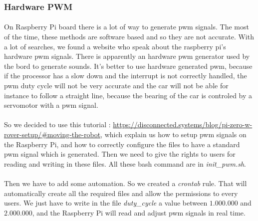 \subsubsection{Hardware PWM}
\paragraph{}
On Raspberry Pi board there is a lot of way to generate pwm signals.
The most of the time, these methods are software based and so they are not
accurate. With a lot of searches, we found a website who speak about the
raspberry pi's hardware pwm signals. There is apparently an hardware pwm
generator used by the bord to generate sounds. It's better to use hardware 
generated pwm, because if the processor has a slow down and the interrupt
is not correctly handled, the pwm duty cycle will not be very accurate and
the car will not be able for instance to follow a straight line, because the
bearing of the car is controled by a servomotor with a pwm signal.

\paragraph{}So we decided to use this tutorial : \url{https://disconnected.systems/blog/pi-zero-w-rover-setup/#moving-the-robot}, 
which explain us how to setup pwm signals on the Raspberry Pi,
and how to correctly configure the files to have a standard pwm signal
which is generated. Then we need to give the rights to users for reading and
writing in these files. All these bash command are in \textit{init\_pwm.sh}.

\paragraph{}
Then we have to add some automation. So we created a \textit{crontab} rule.
That will automatically create all the required files and allow the permissions
to every users. We just have to write in the file \textit{duty\_cycle} a value between
$1.000.000$ and $2.000.000$, and the Raspberry Pi will read and adjust pwm signals
in real time.